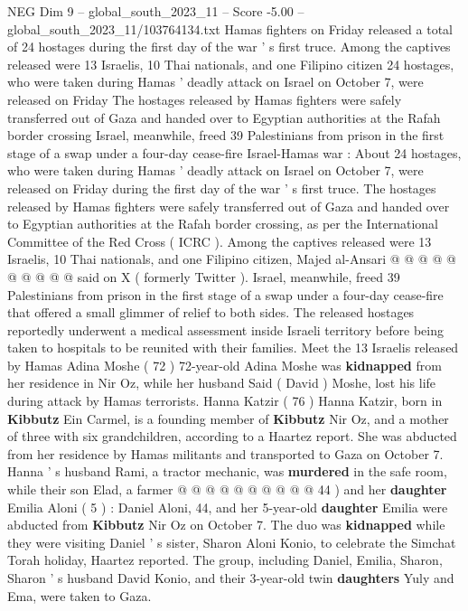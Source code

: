 \begin{textsample}{NEG Dim 9 – global\_south\_2023\_11 – Score -5.00 – global\_south\_2023\_11/103764134.txt}  \label{ex:f9_neg_319}
Hamas fighters on Friday released a total of 24 hostages during the first day of the war ' s first truce.
Among the captives released were 13 Israelis, 10 Thai nationals, and one Filipino citizen 24 hostages, who were taken during Hamas ' deadly attack on Israel on October 7, were released on Friday The hostages released by Hamas fighters were safely transferred out of Gaza and handed over to Egyptian authorities at the Rafah border crossing Israel, meanwhile, freed 39 Palestinians from prison in the first stage of a swap under a four-day cease-fire Israel-Hamas war : About 24 hostages, who were taken during Hamas ' deadly attack on Israel on October 7, were released on Friday during the first day of the war ' s first truce.
The hostages released by Hamas fighters were safely transferred out of Gaza and handed over to Egyptian authorities at the Rafah border crossing, as per the International Committee of the Red Cross ( ICRC ).
Among the captives released were 13 Israelis, 10 Thai nationals, and one Filipino citizen, Majed al-Ansari @ @ @ @ @ @ @ @ @ @ said on X ( formerly Twitter ).
Israel, meanwhile, freed 39 Palestinians from prison in the first stage of a swap under a four-day cease-fire that offered a small glimmer of relief to both sides.
The released hostages reportedly underwent a medical assessment inside Israeli territory before being taken to hospitals to be reunited with their families.
Meet the 13 Israelis released by Hamas Adina Moshe ( 72 ) 72-year-old Adina Moshe was \textbf{kidnapped} from her residence in Nir Oz, while her husband Said ( David ) Moshe, lost his life during attack by Hamas terrorists.
Hanna Katzir ( 76 ) Hanna Katzir, born in \textbf{Kibbutz} Ein Carmel, is a founding member of \textbf{Kibbutz} Nir Oz, and a mother of three with six grandchildren, according to a Haartez report.
She was abducted from her residence by Hamas militants and transported to Gaza on October 7.
Hanna ' s husband Rami, a tractor mechanic, was \textbf{murdered} in the safe room, while their son Elad, a farmer @ @ @ @ @ @ @ @ @ @ 44 ) and her \textbf{daughter} Emilia Aloni ( 5 ) : Daniel Aloni, 44, and her 5-year-old \textbf{daughter} Emilia were abducted from \textbf{Kibbutz} Nir Oz on October 7.
The duo was \textbf{kidnapped} while they were visiting Daniel ' s sister, Sharon Aloni Konio, to celebrate the Simchat Torah holiday, Haartez reported.
The group, including Daniel, Emilia, Sharon, Sharon ' s husband David Konio, and their 3-year-old twin \textbf{daughters} Yuly and Ema, were taken to Gaza.

\end{textsample}
